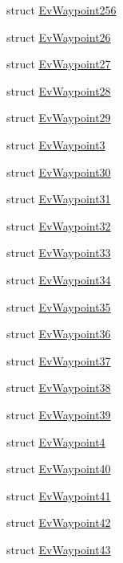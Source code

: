 \begin{DoxyCompactItemize}
\item 
struct \hyperlink{structcl__move__base__z_1_1EvWaypoint256}{Ev\+Waypoint256}
\item 
struct \hyperlink{structcl__move__base__z_1_1EvWaypoint26}{Ev\+Waypoint26}
\item 
struct \hyperlink{structcl__move__base__z_1_1EvWaypoint27}{Ev\+Waypoint27}
\item 
struct \hyperlink{structcl__move__base__z_1_1EvWaypoint28}{Ev\+Waypoint28}
\item 
struct \hyperlink{structcl__move__base__z_1_1EvWaypoint29}{Ev\+Waypoint29}
\item 
struct \hyperlink{structcl__move__base__z_1_1EvWaypoint3}{Ev\+Waypoint3}
\item 
struct \hyperlink{structcl__move__base__z_1_1EvWaypoint30}{Ev\+Waypoint30}
\item 
struct \hyperlink{structcl__move__base__z_1_1EvWaypoint31}{Ev\+Waypoint31}
\item 
struct \hyperlink{structcl__move__base__z_1_1EvWaypoint32}{Ev\+Waypoint32}
\item 
struct \hyperlink{structcl__move__base__z_1_1EvWaypoint33}{Ev\+Waypoint33}
\item 
struct \hyperlink{structcl__move__base__z_1_1EvWaypoint34}{Ev\+Waypoint34}
\item 
struct \hyperlink{structcl__move__base__z_1_1EvWaypoint35}{Ev\+Waypoint35}
\item 
struct \hyperlink{structcl__move__base__z_1_1EvWaypoint36}{Ev\+Waypoint36}
\item 
struct \hyperlink{structcl__move__base__z_1_1EvWaypoint37}{Ev\+Waypoint37}
\item 
struct \hyperlink{structcl__move__base__z_1_1EvWaypoint38}{Ev\+Waypoint38}
\item 
struct \hyperlink{structcl__move__base__z_1_1EvWaypoint39}{Ev\+Waypoint39}
\item 
struct \hyperlink{structcl__move__base__z_1_1EvWaypoint4}{Ev\+Waypoint4}
\item 
struct \hyperlink{structcl__move__base__z_1_1EvWaypoint40}{Ev\+Waypoint40}
\item 
struct \hyperlink{structcl__move__base__z_1_1EvWaypoint41}{Ev\+Waypoint41}
\item 
struct \hyperlink{structcl__move__base__z_1_1EvWaypoint42}{Ev\+Waypoint42}
\item 
struct \hyperlink{structcl__move__base__z_1_1EvWaypoint43}{Ev\+Waypoint43}
\item 

\end{DoxyCompactItemize}
